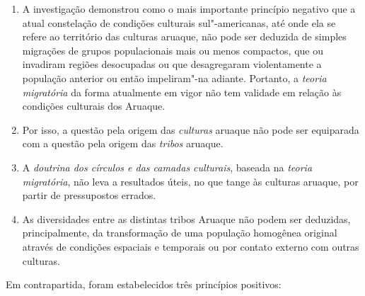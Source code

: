 \begin{enumerate}
\def\labelenumi{\arabic{enumi}.}
\item
  A investigação demonstrou como o mais importante princípio negativo
  que a atual constelação de condições culturais sul"-americanas, até
  onde ela se refere ao território das culturas aruaque, não pode ser
  deduzida de simples migrações de grupos populacionais mais ou menos
  compactos, que ou invadiram regiões desocupadas ou que desagregaram
  violentamente a população anterior ou então impeliram"-na adiante.
  Portanto, a \textit{teoria migratória} da forma atualmente em vigor não tem
  validade em relação às condições culturais dos Aruaque.
\item
  Por isso, a questão pela origem das \textit{culturas} aruaque não pode ser
  equiparada com a questão pela origem das \textit{tribos} aruaque.
\item
  A \textit{doutrina dos círculos e das camadas culturais}, baseada na
  \textit{teoria migratória}, não leva a resultados úteis, no que tange às
  culturas aruaque, por partir de pressupostos errados.
\item
  As diversidades entre as distintas tribos Aruaque não podem ser
  deduzidas, principalmente, da transformação de uma população
  homogênea original através de condições espaciais e temporais ou por
  contato externo com outras culturas.
\end{enumerate}

Em contrapartida, foram estabelecidos três princípios positivos:

